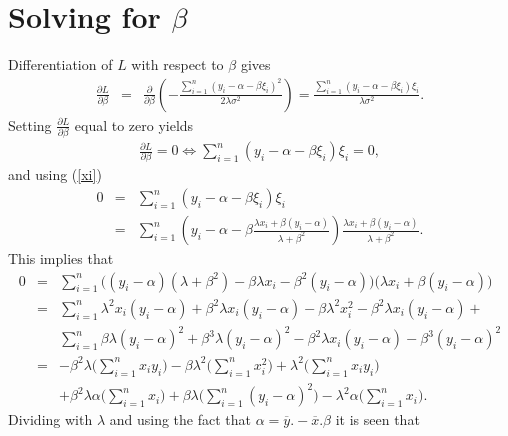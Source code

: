 \documentclass[a4paper,twoside,12pt]{article}
\begin{document}
\section{Solving for $\beta$}
Differentiation of $L$ with respect to $\beta$ gives
\begin{eqnarray*}
\frac{\partial L}{\partial\beta}
&=&
\frac{\partial}{\partial\beta}\left(
-\frac{\sum_{i=1}^n(y_i-\alpha-\beta\xi_i)^2}{2\lambda\sigma^2}\right)
=
\frac{\sum_{i=1}^n (y_i-\alpha-\beta\xi_i)\xi_i}{\lambda\sigma^2}.
\end{eqnarray*}
Setting $\frac{\partial L}{\partial \beta}$ equal to zero yields 
\begin{eqnarray*}
\frac{\partial L}{\partial \beta}=0
\Leftrightarrow
\sum_{i=1}^n(y_i-\alpha-\beta\xi_i)\xi_i=0,
\end{eqnarray*}
and using (\ref{xi})
\begin{eqnarray*}
0
&=&
\sum_{i=1}^n(y_i-\alpha-\beta\xi_i)\xi_i\\[1em]
&=&
\sum_{i=1}^n\left(y_i-\alpha-\beta\frac{\lambda
  x_i+\beta(y_i-\alpha)}{\lambda+\beta^2}\right)\frac{\lambda
  x_i+\beta(y_i-\alpha)}{\lambda+\beta^2}.
\end{eqnarray*}
This implies that
\begin{eqnarray*}
0
&=&
\sum_{i=1}^n\Big(( y_i-\alpha)(\lambda+\beta^2)-\beta\lambda
  x_i-\beta^2(y_i-\alpha)\Big)\Big(\lambda
  x_i+\beta(y_i-\alpha)\Big)\\[1em]
&=&
\sum_{i=1}^n
\lambda^2x_i(y_i-\alpha)
+\beta^2\lambda x_i(y_i-\alpha)
-\beta\lambda^2 x_i^2
-\beta^2\lambda x_i(y_i-\alpha)+\\[1em]
&&
\sum_{i=1}^n\beta\lambda(y_i-\alpha)^2
+\beta^3\lambda(y_i-\alpha)^2
-\beta^2\lambda x_i(y_i-\alpha)
-\beta^3(y_i-\alpha)^2\\[1em]
&=&
-\beta^2\lambda\Big(\sum_{i=1}^nx_iy_i\Big)
-\beta\lambda^2\Big(\sum_{i=1}^n x_i^2\Big)
+\lambda^2\Big(\sum_{i=1}^n x_iy_i\Big)\\[1em]
&&
+\beta^2\lambda\alpha\Big(\sum_{i=1}^nx_i\Big)
+\beta\lambda\Big(\sum_{i=1}^n(y_i-\alpha)^2\Big)
-\lambda^2\alpha\Big(\sum_{i=1}^nx_i\Big).
\end{eqnarray*}
Dividing with $\lambda$ and using the fact that
$\alpha=\overline{y}.-\overline{x}.\beta$ it is seen that
\end{document}
